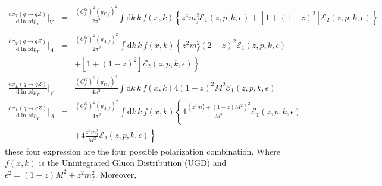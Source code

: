 \documentclass[aps,prd,preprint,superscriptaddress,nofootinbib]{revtex4-2}
\renewcommand{\dd}{\mathrm{d}}
\begin{document}
\begin{eqnarray}
\frac{\dd\sigma_{T}\left(q\rightarrow qZ\right)}{\dd\ln z\dd p_T}\Biggr|_{V}&=& \frac{\left(C_{f}^{G}\right)^{2}\left(g_{V,f}\right)^{2}}{2\pi^{2}}\int\dd k \,k\,f(x,k)\left\{ z^{4}m_{f}^{2}\mathcal{E}_{1}(z,p,k,\epsilon)+\left[1+(1-z)^{2}\right]\mathcal{E}_{2}(z,p,k,\epsilon)\right\} \nonumber \\
\\
\frac{\dd\sigma_{T}\left(q\rightarrow qZ\right)}{ \dd\ln z \dd p_T}\Biggr|_{A} &=& \frac{\left(C_{f}^{G}\right)^{2}\left(g_{A,f}\right)^{2}}{2\pi^{2}}\int\dd k\,k\,f(x,k)\left\{ z^{2}m_{f}^{2}\left(2-z\right)^{2}\mathcal{E}_{1}(z,p,k,\epsilon)
\right. \nonumber \\ && \left.
+\left[1+(1-z)^{2}\right]\mathcal{E}_{2}(z,p,k,\epsilon)\right\} 
\\ 
\frac{ \dd\sigma_{L}\left(q\rightarrow qZ\right)}{ \dd\ln z \dd p_T}\Biggr|_{V} &=& \frac{\left(C_{f}^{G}\right)^{2}\left(g_{V,f}\right)^{2}}{4\pi^{2}}\int\dd k \,k\,f(x,k)4\left(1-z\right)^{2}M^{2}\mathcal{E}_{1}(z,p,k,\epsilon)\\\frac{ \dd\sigma_{L}\left(q\rightarrow qZ\right)}{ \dd\ln z \dd p_T}\Biggr|_{A} &=& \frac{\left(C_{f}^{G}\right)^{2}\left(g_{A,f}\right)^{2}}{4\pi^{2}}\int\dd k \,k\,f(x,k)\left\{ 4\frac{\left(z^{2}m_{f}^{2}+(1-z)M^{2}\right)^{2}}{M^{2}}\mathcal{E}_{1}(z,p,k,\epsilon)
\right. \nonumber \\ && \left.
+4\frac{z^{2}m_{f}^{2}}{M^{2}}\mathcal{E}_{2}(z,p,k,\epsilon)\right\} 
\end{eqnarray}
these four expression are the four possible polarization combination. Where $f(x,k)$ is the Unintegrated Gluon Distribution (UGD) and $\epsilon^{2}=(1-z)M^{2}+z^{2}m_{f}^{2}$. Moreover,
\end{document}
